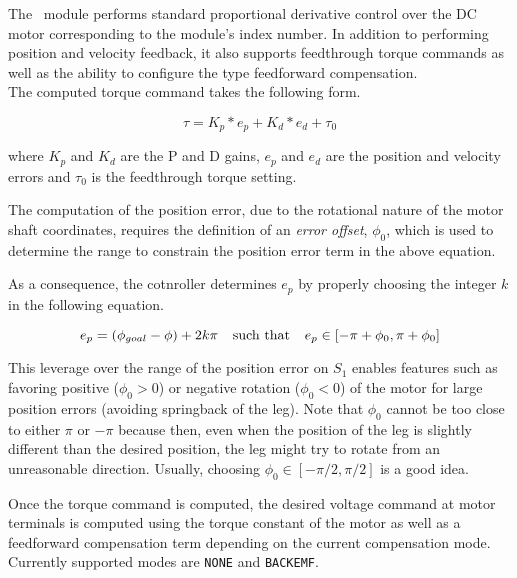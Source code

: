 The \PositionControl\ module performs standard proportional derivative
control over the DC motor corresponding to the module's index number. In
addition to performing position and velocity feedback, it also supports
feedthrough torque commands as well as the ability to configure the type
feedforward compensation.\\

The computed torque command takes the following form.

\begin{equation}
\tau = K_p * e_p + K_d * e_d + \tau_0
\label{eq:torque_feedback}
\end{equation}

where $K_p$ and $K_d$ are the P and D gains, $e_p$ and $e_d$ are the
position and velocity errors and $\tau_0$ is the feedthrough torque setting.

The computation of the position error, due to the rotational nature of the
motor shaft coordinates, requires the definition of an {\em error offset},
$\phi_0$, which is used to determine the range to constrain the position
error term in the above equation.

As a consequence, the cotnroller determines $e_p$ by properly choosing the
integer $k$ in the following equation.

\begin{equation}
e_p = ( \phi_{goal} - \phi ) + 2 k \pi 
\hspace{0.1in}\text{ such that } \hspace{0.1in} 
e_p \in [-\pi+\phi_0, \pi+\phi_0]
\label{eq:pos_error_offset}
\end{equation}

This leverage over the range of the position error on $S_1$ enables features
such as favoring positive ($\phi_0 > 0$) or negative rotation ($\phi_0 < 0$)
of the motor for large position errors (avoiding springback of the leg). Note
that $\phi_0$ cannot be too close to either $\pi$ or $-\pi$ because then,
even when the position of the leg is slightly different than the desired
position, the leg might try to rotate from an unreasonable
direction. Usually, choosing $\phi_0 \in [-\pi/2, \pi/2]$ is a good idea.

Once the torque command is computed, the desired voltage command at motor
terminals is computed using the torque constant of the motor as well as a
feedforward compensation term depending on the current compensation
mode. Currently supported modes are {\tt NONE} and {\tt BACKEMF}.\\

